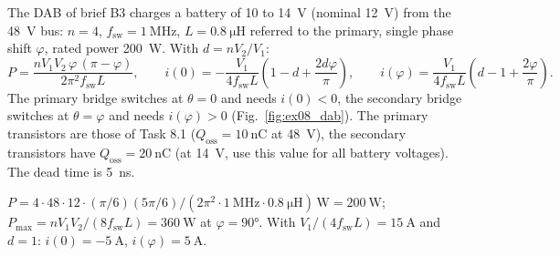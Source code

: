 

The DAB of brief B3 charges a battery of 10 to \SI{14}{\volt} (nominal \SI{12}{\volt}) from the \SI{48}{\volt} bus: $n=4$, $f_\mathrm{sw}=\SI{1}{\mega\hertz}$, $L=\SI{0.8}{\micro\henry}$ referred to the primary, single phase shift $\varphi$, rated power \SI{200}{\watt}. With $d=nV_2/V_1$:
\begin{equation}
	P=\frac{nV_1V_2\,\varphi\,(\pi-\varphi)}{2\pi^2f_\mathrm{sw}L},\qquad i(0)=-\frac{V_1}{4f_\mathrm{sw}L}\left(1-d+\frac{2d\varphi}{\pi}\right),\qquad i(\varphi)=\frac{V_1}{4f_\mathrm{sw}L}\left(d-1+\frac{2\varphi}{\pi}\right).
\end{equation}
The primary bridge switches at $\theta=0$ and needs $i(0)<0$, the secondary bridge switches at $\theta=\varphi$ and needs $i(\varphi)>0$ (Fig.~\ref{fig:ex08_dab}). The primary transistors are those of Task 8.1 ($Q_\mathrm{oss}=\SI{10}{\nano\coulomb}$ at \SI{48}{\volt}), the secondary transistors have $Q_\mathrm{oss}=\SI{20}{\nano\coulomb}$ (at \SI{14}{\volt}, use this value for all battery voltages). The dead time is \SI{5}{\nano\second}.




\begin{solutionblock}
	$P=4\cdot48\cdot12\cdot(\pi/6)(5\pi/6)/(2\pi^2\cdot\SI{1}{\mega\hertz}\cdot\SI{0.8}{\micro\henry})\,\si{\watt}=\SI{200}{\watt}$; $P_\mathrm{max}=nV_1V_2/(8f_\mathrm{sw}L)=\SI{360}{\watt}$ at $\varphi=\ang{90}$. With $V_1/(4f_\mathrm{sw}L)=\SI{15}{\ampere}$ and $d=1$: $i(0)=\SI{-5}{\ampere}$, $i(\varphi)=\SI{5}{\ampere}$.
\end{solutionblock}


